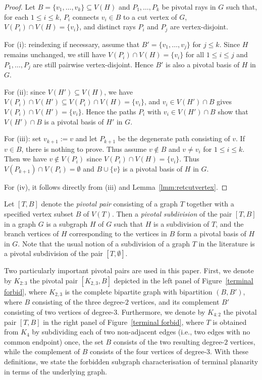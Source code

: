 \documentclass[pdflatex,sn-mathphys-num]{sn-jnl}
\theoremstyle{thmstyleone}%
\theoremstyle{thmstyletwo}%
\theoremstyle{thmstylethree}%
\begin{document}
\begin{proof}
Let $B = \{v_1, \dots, v_k\} \subseteq V(H)$ and $P_1, \dots, P_k$ be pivotal rays in $G$ such that, for each $1 \le i \le k$, $P_i$ connects $v_i \in B$ to a cut vertex of $G$, $V(P_i) \cap V(H) = \{v_i\}$, and distinct rays $P_i$ and $P_j$ are vertex-disjoint.

For (i): reindexing if necessary, assume that $B' = \{v_1, \dots, v_j\}$ for $j\leq k$. Since $H$ remains unchanged, we still have $V(P_i) \cap V(H) = \{v_i\}$ for all $1 \le i \le j$ and $P_1, \dots, P_j$ are still pairwise vertex-disjoint. Hence $B'$ is also a pivotal basis of $H$ in $G$.



For (ii): since $V(H') \subseteq V(H)$, we have $V(P_i) \cap V(H') \subseteq V(P_i) \cap V(H) = \{v_i\}$, and $v_i \in V(H') \cap B$ gives $V(P_i) \cap V(H')= \{v_i\}$. Hence the paths $P_i$ with $v_i\in V(H')\cap B$ show that $V(H')\cap B$ is a pivotal basis of $H'$ in $G$.

For (iii): set $v_{k+1} := v$ and let $P_{k+1}$ be the degenerate path consisting of $v$. If $v\in B$, there is nothing to prove. Thus assume $v\notin B$ and $v \neq v_i$ for $1 \leq i \leq k$. Then we have $v \notin V(P_i)$ since $V(P_i) \cap V(H) = \{v_i\}$. Thus $V(P_{k+1}) \cap V(P_i) = \emptyset$ and $B \cup \{v\}$ is a pivotal basis of $H$ in $G$.

For (iv), it follows directly from (iii) and Lemma~\ref{lmm:retcutvertex}.
\end{proof}





Let $[T,B]$ denote the {\em pivotal pair} consisting of a graph $T$ together with a specified vertex subset $B$ of $V(T)$. Then a \emph{pivotal subdivision} of the pair  $[T,B]$ in a graph $G$ is a subgraph $H$ of $G$ such that $H$ is a subdivision of $T$, and the branch vertices of $H$ corresponding to the vertices in $B$ form a pivotal basis of $H$ in $G$. Note that the usual notion of a subdivision of a graph $T$ in the literature is a pivotal subdivision of the pair $[T,\emptyset]$. 

Two particularly important pivotal pairs are used in this paper. First, we denote by $K_{2:3}$ the pivotal pair $[K_{2,3},B]$ depicted in the left panel of Figure~\ref{terminal forbid}, where $K_{2,3}$ is the complete bipartite graph with bipartition $(B,B')$, where $B$ consisting of the three degree-$2$ vertices, and its complement $B'$ consisting of two vertices of degree-$3$. Furthermore, we denote by $K_{4:2}$ the pivotal pair  $[T,B]$ in the right panel of Figure~\ref{terminal forbid}, where  $T$ is obtained from $K_4$ by subdividing each of two non-adjacent edges (i.e., two edges with no common endpoint) once, the set $B$ consists of the two resulting degree-$2$ vertices, while the complement of $B$ consists of the four vertices of degree-$3$. 
 With these definitions, we state the forbidden subgraph characterisation of terminal planarity in terms of the underlying graph.
\end{document}
